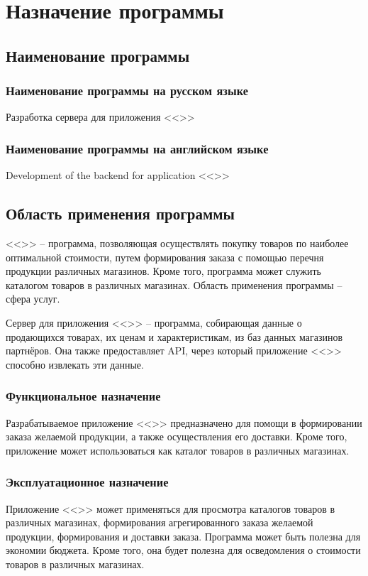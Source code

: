 \documentclass[a4paper,12pt]{article}
\begin{document}
  \CRTsign
  \CRTpreamble

  \section{Назначение программы}
  \subsection{Наименование программы}
  \subsubsection{Наименование программы на русском языке}
  Разработка сервера для приложения <<\CRTname>>
  \subsubsection{Наименование программы на английском языке}
  Development of the backend for application <<\CRTnameeng>>

  \subsection{Область применения программы}
  <<\CRTname>> -- программа, позволяющая осуществлять покупку товаров по наиболее оптимальной стоимости,
  путем формирования заказа с помощью перечня продукции различных магазинов.
  Кроме того, программа может служить каталогом товаров в различных магазинах.
  Область применения программы -- сфера услуг.

  Сервер для приложения <<\CRTname>> -- программа, собирающая данные о продающихся товарах, их ценам и характеристикам,
  из баз данных магазинов партнёров.
  Она также предоставляет API, через который приложение <<\CRTname>> способно извлекать эти данные.

  \subsubsection{Функциональное назначение}
  Разрабатываемое приложение <<\CRTname>> предназначено для помощи в формировании заказа желаемой продукции, а также осуществления его доставки.
  Кроме того, приложение может использоваться как каталог товаров в различных магазинах.

  \subsubsection{Эксплуатационное назначение}
  Приложение <<\CRTname>> может применяться для просмотра каталогов товаров в различных магазинах,
  формирования агрегированного заказа желаемой продукции, формирования и доставки заказа.
  Программа может быть полезна для экономии бюджета.
  Кроме того, она будет полезна для осведомления о стоимости товаров в различных магазинах.
\end{document}
